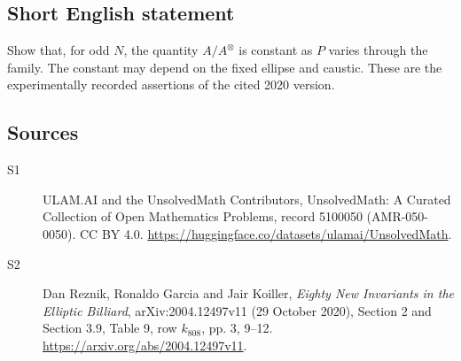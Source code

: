 \documentclass[11pt]{article}
\begin{document}
\subsection{Short English statement}
Show that, for odd $N$, the quantity $A/A^\otimes$ is constant as $P$ varies through the family. The constant may depend on the fixed ellipse and caustic. These are the experimentally recorded assertions of the cited 2020 version.
\subsection{Sources}
\begin{description}
\item[\hypertarget{source:5100050:1}{S1}] ULAM.AI and the UnsolvedMath Contributors, UnsolvedMath: A Curated Collection of Open Mathematics Problems, record 5100050 (AMR-050-0050). CC BY 4.0. \url{https://huggingface.co/datasets/ulamai/UnsolvedMath}.
\item[\hypertarget{source:5100050:2}{S2}] Dan Reznik, Ronaldo Garcia and Jair Koiller, \emph{Eighty New Invariants in the Elliptic Billiard}, arXiv:2004.12497v11 (29 October 2020), Section 2 and Section 3.9, Table 9, row $k_{808}$, pp. 3, 9--12. \url{https://arxiv.org/abs/2004.12497v11}.
\end{description}
\label{end:5100050}
\end{document}
